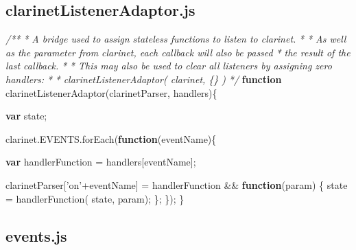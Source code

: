 \documentclass[]{article}
\newenvironment{Shaded}{}{}
\newcommand{\KeywordTok}[1]{\textcolor[rgb]{0.00,0.44,0.13}{\textbf{{#1}}}}
\newcommand{\StringTok}[1]{\textcolor[rgb]{0.25,0.44,0.63}{{#1}}}
\newcommand{\CommentTok}[1]{\textcolor[rgb]{0.38,0.63,0.69}{\textit{{#1}}}}
\newcommand{\OtherTok}[1]{\textcolor[rgb]{0.00,0.44,0.13}{{#1}}}
\newcommand{\FunctionTok}[1]{\textcolor[rgb]{0.02,0.16,0.49}{{#1}}}
\newcommand{\NormalTok}[1]{{#1}}
\begin{document}
\subsection{clarinetListenerAdaptor.js}

\label{src_clarinetListenerAdaptor}

\begin{Shaded}
\begin{Highlighting}[]

\CommentTok{/** }
\CommentTok{ * A bridge used to assign stateless functions to listen to clarinet.}
\CommentTok{ * }
\CommentTok{ * As well as the parameter from clarinet, each callback will also be passed}
\CommentTok{ * the result of the last callback.}
\CommentTok{ * }
\CommentTok{ * This may also be used to clear all listeners by assigning zero handlers:}
\CommentTok{ * }
\CommentTok{ *    clarinetListenerAdaptor( clarinet, \{\} )}
\CommentTok{ */}
\KeywordTok{function} \FunctionTok{clarinetListenerAdaptor}\NormalTok{(clarinetParser, handlers)\{}
    
   \KeywordTok{var} \NormalTok{state;}

   \OtherTok{clarinet}\NormalTok{.}\OtherTok{EVENTS}\NormalTok{.}\FunctionTok{forEach}\NormalTok{(}\KeywordTok{function}\NormalTok{(eventName)\{}
 
      \KeywordTok{var} \NormalTok{handlerFunction = handlers[eventName];}
      
      \NormalTok{clarinetParser[}\StringTok{'on'}\NormalTok{+eventName] = handlerFunction && }
                                       \KeywordTok{function}\NormalTok{(param) \{}
                                          \NormalTok{state = }\FunctionTok{handlerFunction}\NormalTok{( state, param);}
                                       \NormalTok{\};}
   \NormalTok{\});}
\NormalTok{\}}
\end{Highlighting}
\end{Shaded}

\pagebreak

\subsection{events.js}

\label{src_events}
\end{document}
